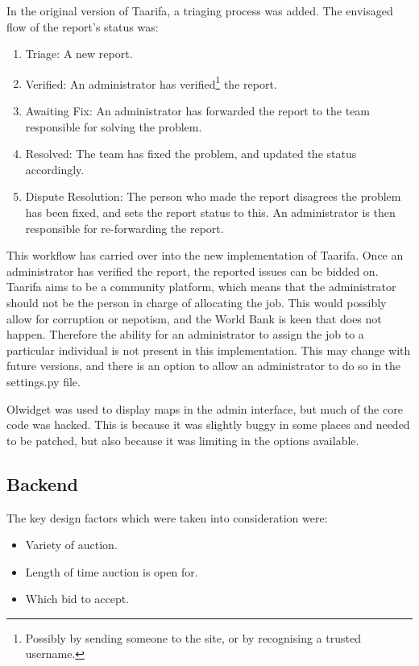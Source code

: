 In the original version of Taarifa, a triaging process was added. The envisaged flow of the report's status was:
\begin{enumerate}
\item Triage: A new report.
\item Verified: An administrator has verified\footnote{Possibly by sending someone to the site, or by recognising a trusted username.} the report.
\item Awaiting Fix: An administrator has forwarded the report to the team responsible for solving the problem.
\item Resolved: The team has fixed the problem, and updated the status accordingly.
\item Dispute Resolution: The person who made the report disagrees the problem has been fixed, and sets the report status to this. An administrator is then responsible for re-forwarding the report.
\end{enumerate} 

This workflow has carried over into the new implementation of Taarifa. Once an administrator has verified the report, the reported issues can be bidded on. Taarifa aims to be a community platform, which means that the administrator should not be the person in charge of allocating the job. This would possibly allow for corruption or nepotism, and the World Bank is keen that does not happen. Therefore the ability for an administrator to assign the job to a particular individual is not present in this implementation. This may change with future versions, and there is an option to allow an administrator to do so in the settings.py file.

Olwidget was used to display maps in the admin interface, but much of the core code was hacked. This is because it was slightly buggy in some places and needed to be patched, but also because it was limiting in the options available.

\subsection{Backend}

The key design factors which were taken into consideration were:
\begin{itemize}
\item Variety of auction.
\item Length of time auction is open for.
\item Which bid to accept.
\end{itemize}

